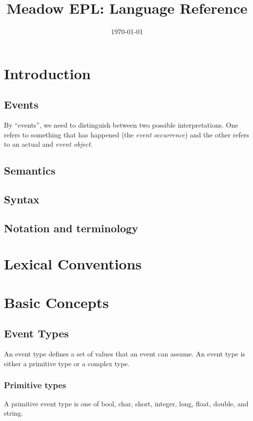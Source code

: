 \documentclass[twocolumn]{report}
\begin{document}
\small

\title{\huge\bf Meadow EPL: Language Reference}
\author{}
\date{\Large\today}
\maketitle

\tableofcontents

\chapter{Introduction}

\section{Events}
By ``events'', we need to distinguish between two possible interpretations.
One refers to something that has happened (the {\em event occurrence}) and
the other refers to an actual and {\em event object\/}. 

\section{Semantics}
\section{Syntax}
\section{Notation and terminology}

\chapter{Lexical Conventions}
  
\chapter{Basic Concepts}
\section{Event Types}
An event type defines a set of values that an event can assume. An event type
is either a primitive type or a complex type.

\subsection{Primitive types}
A primitive event type is one of bool, char, short, integer, long, float,
double, and string. 
\end{document}
